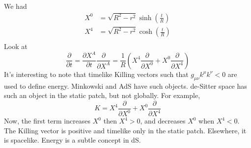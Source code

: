  We had 
 \begin{align*}
	 X ^ 0 &=  \sqrt{ R ^ 2 - r ^ 2 }  \sinh \left(  \frac{t}{R} \right)  \\
	 X ^ 4 &=  \sqrt{ R ^ 2 - r ^ 2 }  \cosh \left(  \frac{t}{R} \right)  \\
 \end{align*}
 Look at 
 \[
  \frac{\partial  }{\partial  t }  =  \frac{\partial X ^ A  }{\partial t }  
  \frac{\partial  }{\partial  X ^ A }   = \frac{1}{R  } \left(  X ^ 4 \frac{\partial  }{\partial  X ^ 0 }
   + X ^ 0 \frac{\partial   }{\partial X ^ 4 } \right) 
 \]  It's interesting to note that 
 timelike Killing vectors such that $ g_{ \mu \nu  }  k ^ \mu k ^ \nu  < 0 $ 
 are used to define energy. Minkowski and AdS have such objects. 
 de-Sitter space has such an object in the static patch, 
 but not globally. 
For example, 
\[
 K = X ^ 4 \frac{\partial  }{\partial  X ^ 0 }  + X ^ 0 \frac{\partial  }{\partial  X ^ 4 } 
\] Now, the first term increases $ X ^ 0 $ then $ X ^ 4 > 0 $, 
and decreases $ X ^ 0 $ when $ X ^ 4 < 0 $. 
The Killing vector is positive and timelike only in the static patch. 
Elsewhere, it is spacelike. Energy is a subtle concept in dS.

